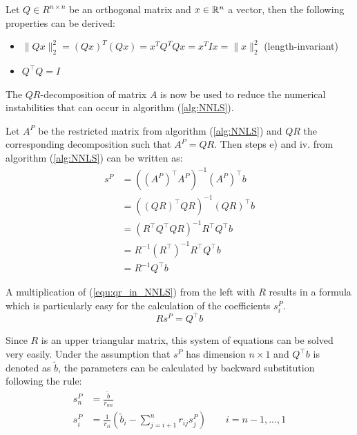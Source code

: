 \begin{remark} Let $Q \in R^{n \times n}$ be an orthogonal matrix and $x \in \mathbb{R}^n$ a vector, then the following properties can be derived:
	\begin{itemize}
		\item $\lVert Qx \rVert_2^2 = (Qx)^T (Qx) = x^T Q^T Q x = x^T I x = \lVert x \rVert_2^2$ \hfill (length-invariant)
		\item $Q^\top Q = I$
	\end{itemize}
\end{remark}

The $QR$-decomposition of matrix $A$ is now be used to reduce the numerical instabilities that can occur in algorithm (\ref{alg:NNLS}). 

\begin{remark} Let $A^P$ be the restricted matrix from algorithm (\ref{alg:NNLS}) and $QR$ the corresponding decomposition such that $A^P = QR$. Then steps e) and iv. from algorithm (\ref{alg:NNLS}) can be written as:
	\begin{equation}\label{equ:qr_in_NNLS}
		\begin{aligned}
			 s^P 	&= ((A^P)^\top A^P)^{-1} (A^P)^\top b \\
			 		&= ((QR)^\top QR)^{-1} (QR)^\top b \\
			 		&= (R^\top Q^\top Q R)^{-1} R^\top Q^\top b \\
			 		&= R^{-1} (R^\top)^{-1} R^\top Q^\top b \\
			 		&= R^{-1} Q^\top b
		\end{aligned}
	\end{equation}
\end{remark}

A multiplication of (\ref{equ:qr_in_NNLS}) from the left with $R$ results in a formula which is particularly easy for the calculation of the coefficients $s^P_i$.
\begin{equation}
	R s^P = Q^\top b
\end{equation}

Since $R$ is an upper triangular matrix, this system of equations can be solved very easily. Under the assumption that $s^P$ has dimension $n \times 1$ and $Q^\top b$ is denoted as $\tilde{b}$, the parameters can be calculated by backward substitution following the rule:
\begin{align*}
	s^P_n 	&= \frac{\tilde{b}}{r_{nn}} \\
	s^P_i	&= \frac{1}{r_{ii}} \left( \tilde{b}_i - \sum_{j = i + 1}^{n} r_{ij} s^P_j\right) \quad \quad i = n-1, ..., 1
\end{align*}

